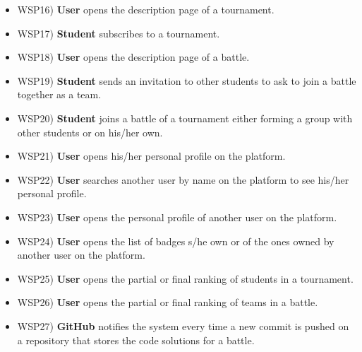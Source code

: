 \begin{itemize}
		\item WSP16) \textbf{User} opens the description page of a tournament.
		\item WSP17) \textbf{Student} subscribes to a tournament.
		\item WSP18) \textbf{User} opens the description page of a battle.
		\item WSP19) \textbf{Student} sends an invitation to other students to ask to join a battle together as a team.
		\item WSP20) \textbf{Student} joins a battle of a tournament either forming a group with other students or on his/her own.
		\item WSP21) \textbf{User} opens his/her personal profile on the platform.
		\item WSP22) \textbf{User} searches another user by name on the platform to see his/her personal profile.
		\item WSP23) \textbf{User} opens the personal profile of another user on the platform.
		\item WSP24) \textbf{User} opens the list of badges s/he own or of the ones owned by another user on the platform.
		\item WSP25) \textbf{User} opens the partial or final ranking of students in a tournament.
		\item WSP26) \textbf{User} opens the partial or final ranking of teams in a battle.
		\item WSP27) \textbf{GitHub} notifies the system every time a new commit is pushed on a repository that stores the code solutions for a battle.
	\end{itemize}
	
